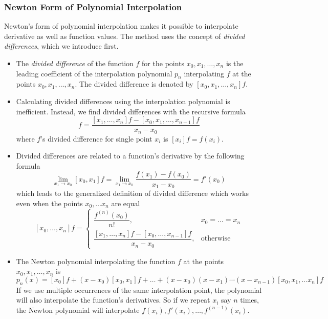 \documentclass[11pt, a4paper]{article}
\begin{document}
\subsubsection{Newton Form of Polynomial Interpolation}
Newton's form of polynomial interpolation makes it possible to interpolate derivative as well as function values. The method uses the concept of \textit{divided differences}, which we introduce first.
\begin{itemize}
	\item The \textit{divided difference} of the function $ f $ for the points $ x_0, x_1, \dots, x_n $  is the leading coefficient of the interpolation polynomial $ p_n $ interpolating $ f $ at the points $ x_0, x_1, \dots, x_n $. The divided difference is denoted by $ [x_0, x_1, \dots, x_n]f $.
	
	\item Calculating divided differences using the interpolation polynomial is inefficient. Instead, we find divided differences with the recursive formula
	\begin{equation*}
		[ x_0, x_1, \dots, x_n ] f = \frac{[x_1, \dots, x_n ]f - [x_0, x_1, \dots, x_{n-1}]f }{x_n - x_0}
	\end{equation*}
	where $ f $'s divided difference for single point $ x_{i} $ is  $ [x_i]f = f(x_i) $. 
	
	\item Divided differences are related to a function's derivative by the following formula
	\begin{equation*}
		\lim_{x_1 \to x_{0}} [x_{0}, x_{1}]f = \lim_{x_1 \to x_{0}} \frac{f(x_1) - f(x_0)}{x_1 - x_0} = f'(x_0)
	\end{equation*}
	which leads to the generalized definition of divided difference which works even when the points $ x_0, \dots x_n $ are equal
	\[
		[x_0, \dots, x_n]f =
		\begin{cases}
			\dfrac{f^{(n)}(x_0)}{n!} , & x_0 = \dots = x_n\\[1mm]
			\dfrac{[x_1, \dots, x_n]f - [x_0, \dots, x_{n-1}]f}{x_n - x_0}, & \text{otherwise}
		\end{cases}
	\]

	\item The Newton polynomial interpolating the function $ f $ at the points $ x_0, x_1, \dots, x_n $ is
	\begin{equation*}
		p_{n}(x) = [x_0]f + (x - x_0)[x_0, x_1]f + \dots + (x - x_0)(x - x_1) \cdots (x - x_{n-1})[x_0, x_1, \dots x_n]f
	\end{equation*}
	If we use multiple occurrences of the same interpolation point, the polynomial will also interpolate the function's derivatives. So if we repeat $ x_i $ say $ n $ times, the Newton polynomial will interpolate $ f(x_{i}), f'(x_{i}), \ldots, f^{(n-1)}(x_{i})$.
	

\end{itemize}
\end{document}
